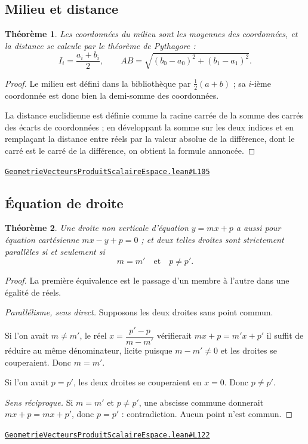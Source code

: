 \documentclass[11pt,a4paper]{article}
\theoremstyle{definition}
\theoremstyle{plain}
\newtheorem{theoreme}{Théorème}
\newcommand{\source}[2]{\par\smallskip\noindent\hfill{\footnotesize\href{#1}{\texttt{#2}}}\par\smallskip}
\begin{document}
\subsection{Milieu et distance}

\begin{theoreme}
Les coordonnées du milieu sont les moyennes des coordonnées, et la distance se calcule par
le théorème de Pythagore :
\[ I_i = \frac{a_i + b_i}{2} , \qquad
   AB = \sqrt{(b_0 - a_0)^{2} + (b_1 - a_1)^{2}} . \]
\end{theoreme}

\begin{proof}
Le milieu est défini dans la bibliothèque par $\frac{1}{2}(a + b)$ ; sa $i$-ième
coordonnée est donc bien la demi-somme des coordonnées.

La distance euclidienne est définie comme la racine carrée de la somme des carrés des
écarts de coordonnées ; en développant la somme sur les deux indices et en remplaçant la
distance entre réels par la valeur absolue de la différence, dont le carré est le carré de
la différence, on obtient la formule annoncée.
\end{proof}
\source{https://github.com/Commutator-IO/learn-lean/blob/main/cours/02-lycee/08-geometrie-vecteurs-produit-scalaire-espace/GeometrieVecteursProduitScalaireEspace.lean\#L105}{GeometrieVecteursProduitScalaireEspace.lean\#L105}

\subsection{Équation de droite}

\begin{theoreme}
Une droite non verticale d'équation $y = mx + p$ a aussi pour équation cartésienne
$mx - y + p = 0$ ; et deux telles droites sont strictement parallèles si et seulement si
\[ m = m' \quad\text{et}\quad p \ne p' . \]
\end{theoreme}

\begin{proof}
La première équivalence est le passage d'un membre à l'autre dans une égalité de réels.

\smallskip\noindent
\emph{Parallélisme, sens direct.} Supposons les deux droites sans point commun.

Si l'on avait $m \ne m'$, le réel $x = \dfrac{p' - p}{m - m'}$ vérifierait
$mx + p = m'x + p'$ \textemdash{} il suffit de réduire au même dénominateur, licite
puisque $m - m' \ne 0$ \textemdash{} et les droites se couperaient. Donc $m = m'$.

Si l'on avait $p = p'$, les deux droites se couperaient en $x = 0$. Donc $p \ne p'$.

\smallskip\noindent
\emph{Sens réciproque.} Si $m = m'$ et $p \ne p'$, une abscisse commune donnerait
$mx + p = mx + p'$, donc $p = p'$ : contradiction. Aucun point n'est commun.
\end{proof}
\source{https://github.com/Commutator-IO/learn-lean/blob/main/cours/02-lycee/08-geometrie-vecteurs-produit-scalaire-espace/GeometrieVecteursProduitScalaireEspace.lean\#L122}{GeometrieVecteursProduitScalaireEspace.lean\#L122}
\end{document}
